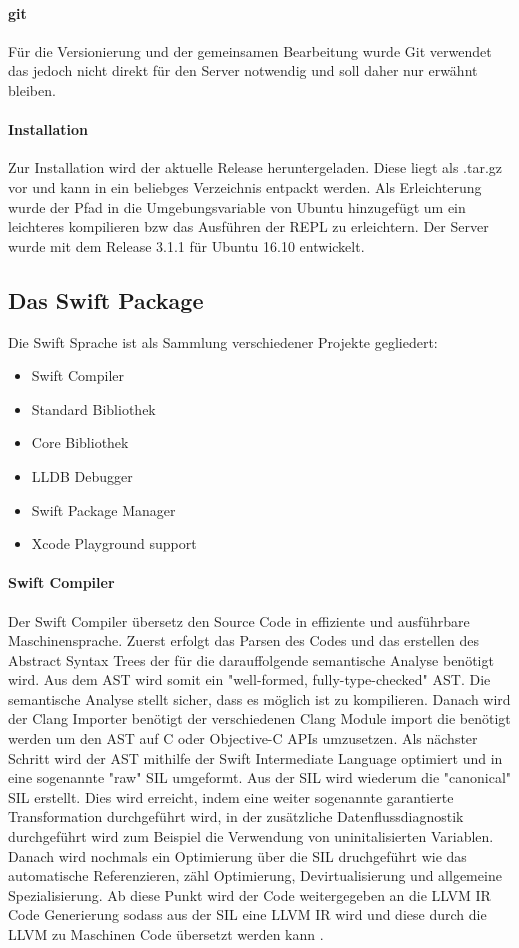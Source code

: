 \paragraph{git}
Für die Versionierung und der gemeinsamen Bearbeitung wurde Git verwendet das jedoch nicht direkt für den Server notwendig und soll daher nur erwähnt bleiben.

\paragraph{Installation}
Zur Installation wird der aktuelle Release heruntergeladen. Diese liegt als .tar.gz vor und kann in ein beliebges Verzeichnis entpackt werden. Als Erleichterung wurde der Pfad in die Umgebungsvariable von Ubuntu hinzugefügt um ein leichteres kompilieren bzw das Ausführen der REPL zu erleichtern. Der Server wurde mit dem Release 3.1.1 für Ubuntu 16.10 entwickelt.

\subsection{Das Swift Package}
\label{sec: dasswiftpackage}
Die Swift Sprache ist als Sammlung verschiedener Projekte gegliedert:
\begin{itemize}
\item Swift Compiler
\item Standard Bibliothek 
\item Core Bibliothek
\item LLDB Debugger
\item Swift Package Manager
\item Xcode Playground support
\end{itemize}

\paragraph{Swift Compiler}
Der Swift Compiler übersetz den Source Code in effiziente und ausführbare Maschinensprache. Zuerst erfolgt das Parsen des Codes und das erstellen des Abstract Syntax Trees der für die darauffolgende semantische Analyse benötigt wird. Aus dem AST wird somit ein "well-formed, fully-type-checked" AST. Die semantische Analyse stellt sicher, dass es möglich ist zu kompilieren.  Danach wird der Clang Importer benötigt der verschiedenen Clang Module import die benötigt werden um den AST auf C oder Objective-C APIs umzusetzen. Als nächster Schritt wird der AST mithilfe der Swift Intermediate Language optimiert und in eine sogenannte "raw" SIL umgeformt. Aus der SIL wird wiederum die "canonical" SIL erstellt. Dies wird erreicht, indem eine weiter sogenannte garantierte Transformation durchgeführt wird, in der zusätzliche Datenflussdiagnostik durchgeführt wird zum Beispiel die Verwendung von uninitalisierten Variablen. Danach wird nochmals ein Optimierung über die SIL druchgeführt wie das automatische Referenzieren, zähl Optimierung, Devirtualisierung und allgemeine Spezialisierung. Ab diese Punkt wird der Code weitergegeben an die LLVM IR Code Generierung sodass aus der SIL eine LLVM IR wird und diese durch die LLVM zu Maschinen Code übersetzt werden kann \parencite{swiftcompiler}. 

